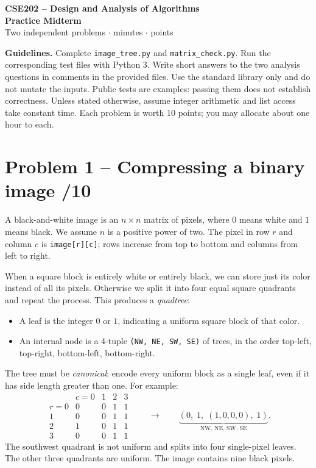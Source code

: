 \documentclass[11pt,a4paper]{article}
\begin{document}
\begin{center}{\large\bfseries CSE202 -- Design and Analysis of Algorithms}\\[4pt]{\LARGE\bfseries Practice Midterm}\\[5pt]Two independent problems \quad $\cdot$  minutes \quad $\cdot$  points\end{center}
\textbf{Guidelines.} Complete \texttt{image\_tree.py} and \texttt{matrix\_check.py}. Run the corresponding test files with Python 3. Write short answers to the two analysis questions in comments in the provided files. Use the standard library only and do not mutate the inputs. Public tests are examples: passing them does not establish correctness. Unless stated otherwise, assume integer arithmetic and list access take constant time. Each problem is worth 10 points; you may allocate about one hour to each.
\section*{Problem 1 -- Compressing a binary image \hfill /10}
A black-and-white image is an $n\times n$ matrix of pixels, where $0$ means white and $1$ means black. We assume $n$ is a positive power of two. The pixel in row $r$ and column $c$ is \texttt{image[r][c]}; rows increase from top to bottom and columns from left to right.

When a square block is entirely white or entirely black, we can store just its color instead of all its pixels. Otherwise we split it into four equal square quadrants and repeat the process. This produces a \emph{quadtree}:
\begin{itemize}\item A leaf is the integer $0$ or $1$, indicating a uniform square block of that color.
\item An internal node is a 4-tuple \texttt{(NW, NE, SW, SE)} of trees, in the order top-left, top-right, bottom-left, bottom-right.
\end{itemize}
The tree must be \emph{canonical}: encode every uniform block as a single leaf, even if it has side length greater than one. For example:
\[
\begin{array}{c|cccc}
 &c=0&1&2&3\\\hline
r=0&0&0&1&1\\
1&0&0&1&1\\
2&1&0&1&1\\
3&0&0&1&1
\end{array}
\qquad\longrightarrow\qquad
\underbrace{(0,\;1,\;(1,0,0,0),\;1)}_{\text{NW, NE, SW, SE}}.
\]
The southwest quadrant is not uniform and splits into four single-pixel leaves. The other three quadrants are uniform. The image contains nine black pixels.
\newpage
\end{document}
